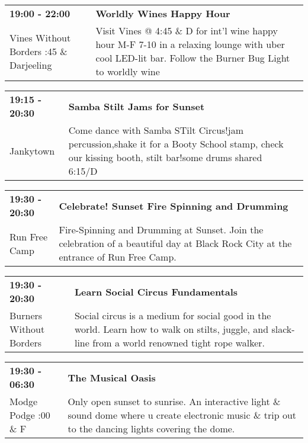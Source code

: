 \begin{tabular}{ p{1in} p{2.2in} }
    \textbf{19:00 - 22:00} & \textbf{Worldly Wines Happy Hour} \\
    Vines Without Borders \newline 4:45 \& Darjeeling & Visit Vines @ 4:45 \& D for int'l wine happy hour M-F 7-10 in a relaxing lounge with uber cool LED-lit bar. Follow the Burner Bug Light to worldly wine \\
    \hline 
\end{tabular}
    
\begin{tabular}{ p{1in} p{2.2in} }
    \textbf{19:15 - 20:30} & \textbf{Samba Stilt Jams for Sunset} \\
    Jankytown \newline  & Come dance with Samba STilt Circus!jam percussion,shake it for a Booty School stamp, check our kissing booth, stilt bar!some drums shared~ 6:15/D \\
    \hline 
\end{tabular}
    
\begin{tabular}{ p{1in} p{2.2in} }
    \textbf{19:30 - 20:30} & \textbf{Celebrate! Sunset Fire Spinning and Drumming} \\
    Run Free Camp \newline  & Fire-Spinning and Drumming at Sunset. Join the celebration of a beautiful day at Black Rock City at the entrance of Run Free Camp. \\
    \hline 
\end{tabular}
    
\begin{tabular}{ p{1in} p{2.2in} }
    \textbf{19:30 - 20:30} & \textbf{Learn Social Circus Fundamentals} \\
    Burners Without Borders \newline  & Social circus is a medium for social good in the world. Learn how to walk on stilts, juggle, and  slack-line from a world renowned tight rope walker. \\
    \hline 
\end{tabular}
    
\begin{tabular}{ p{1in} p{2.2in} }
    \textbf{19:30 - 06:30} & \textbf{The Musical Oasis} \\
    Modge Podge \newline 9:00 \& F & Only open sunset to sunrise.  An interactive light \& sound dome where u create electronic music \& trip out to the dancing lights covering the dome. \\
    \hline 
\end{tabular}
    
